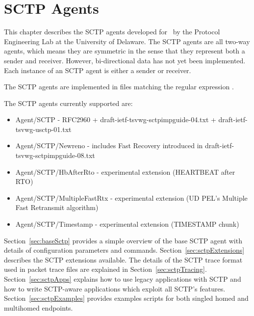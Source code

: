 \chapter{SCTP Agents}
\label{sec:sctpAgents}

   This chapter describes the SCTP agents developed for \ns~by the
   Protocol Engineering Lab at the University of Delaware.  The SCTP
   agents are all two-way agents, which means they are symmetric in the
   sense that they represent both a sender and receiver. However,
   bi-directional data has not yet been implemented. Each instance of an
   SCTP agent is either a sender or receiver.

   The SCTP agents are implemented in files matching the regular
   expression .

   The SCTP agents currently supported are:

   \begin{itemize}\itemsep0pt

      \item Agent/SCTP - RFC2960 + draft-ietf-tsvwg-sctpimpguide-04.txt +
      draft-ietf-tsvwg-usctp-01.txt

      \item Agent/SCTP/Newreno - includes Fast Recovery introduced in
      draft-ietf-tsvwg-sctpimpguide-08.txt

      \item Agent/SCTP/HbAfterRto - experimental extension (HEARTBEAT
      after RTO)

      \item Agent/SCTP/MultipleFastRtx - experimental extension (UD PEL's
      Multiple Fast Retransmit algorithm)

      \item Agent/SCTP/Timestamp - experimental extension (TIMESTAMP chunk)

   \end{itemize}

   Section~\ref{sec:baseSctp} provides a simple overview of the base SCTP
   agent with details of configuration parameters and
   commands. Section~\ref{sec:sctpExtensions} describes the SCTP
   extensions available. The details of the SCTP trace format used in
   packet trace files are explained in
   Section~\ref{sec:sctpTracing}. Section~\ref{sec:sctpApps} explains how
   to use legacy applications with SCTP and how to write SCTP-aware
   applications which exploit all SCTP's
   features. Section~\ref{sec:sctpExamples} provides examples scripts for
   both singled homed and multihomed endpoints.

